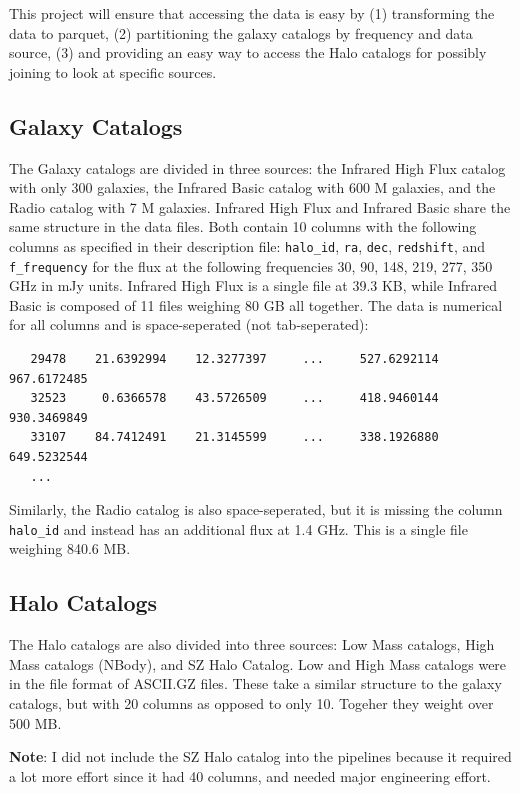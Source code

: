 \documentclass[12pt,letterpaper]{article}
\newcommand{\textapprox}{\raisebox{0.5ex}{\texttildelow}}
\begin{document}
This project will ensure that accessing
the data is easy by (1) transforming the data to parquet, (2) partitioning the
galaxy catalogs by frequency and data source, (3) and providing an easy way to
access the Halo catalogs for possibly joining to look at specific sources.

\subsection*{Galaxy Catalogs}
The Galaxy catalogs are divided in three sources: the Infrared High Flux
catalog with only \textapprox 300 galaxies, the Infrared Basic catalog with
\textapprox 600 M galaxies, and the Radio catalog with \textapprox 7 M
galaxies. Infrared High Flux and Infrared Basic share the same structure in the
data files. Both contain 10 columns with the following columns as specified in
their description file: \texttt{halo\_id}, \texttt{ra}, \texttt{dec},
\texttt{redshift}, and \texttt{f\_frequency} for the flux at the following
frequencies 30, 90, 148, 219, 277, 350 GHz in mJy units.  Infrared High Flux is
a single file at 39.3 KB, while Infrared Basic is composed of 11 files weighing
80 GB all together.  The data is numerical for all columns and is
space-seperated (not tab-seperated):

\begin{verbatim}
   29478    21.6392994    12.3277397     ...     527.6292114   967.6172485
   32523     0.6366578    43.5726509     ...     418.9460144   930.3469849
   33107    84.7412491    21.3145599     ...     338.1926880   649.5232544
   ...
\end{verbatim}

Similarly, the Radio catalog is also space-seperated, but it is missing the
column \texttt{halo\_id} and instead has an additional flux at 1.4 GHz. This is
a single file weighing 840.6 MB.

\subsection*{Halo Catalogs}
The Halo catalogs are also divided into three sources: Low Mass catalogs, High
Mass catalogs (NBody), and SZ Halo Catalog. Low and High Mass catalogs were in
the file format of ASCII.GZ files. These take a similar structure to the galaxy
catalogs, but with 20 columns as opposed to only 10. Togeher they weight over
500 MB.

\textbf{Note}: I did not include the SZ Halo catalog into the pipelines because
it required a lot more effort since it had 40 columns, and needed major
engineering effort.
\end{document}
